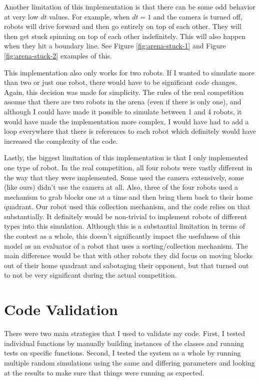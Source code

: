 \documentclass[12pt]{article}
\begin{document}
Another limitation of this implementation is that there can be some odd behavior at very low $dt$ values. For example, when $dt=1$ and the camera is turned off, robots will drive forward and then go entirely on top of each other. They will then get stuck spinning on top of each other indefinitely. This will also happen when they hit a boundary line. See Figure \ref{fig:arena-stuck-1} and Figure \ref{fig:arena-stuck-2} examples of this.

This implementation also only works for two robots. If I wanted to simulate more than two or just one robot, there would have to be significant code changes. Again, this decision was made for simplicity. The rules of the real competition assume that there are two robots in the arena (even if there is only one), and although I could have made it possible to simulate between 1 and 4 robots, it would have made the implementation more complex. I would have had to add a loop everywhere that there is references to each robot which definitely would have increased the complexity of the code.

Lastly, the biggest limitation of this implementation is that I only implemented one type of robot. In the real competition, all four robots were vastly different in the way that they were implemented. Some used the camera extensively, some (like ours) didn't use the camera at all. Also, three of the four robots used a mechanism to grab blocks one at a time and then bring them back to their home quadrant. Our robot used this collection mechanism, and the code relies on that substantially. It definitely would be non-trivial to implement robots of different types into this simulation. Although this is a substantial limitation in terms of the contest as a whole, this doesn't significantly impact the usefulness of this model as an evaluator of a robot that uses a sorting/collection mechanism. The main difference would be that with other robots they did focus on moving blocks out of their home quadrant and sabotaging their opponent, but that turned out to not be very significant during the actual competition.

\section{Code Validation}
There were two main strategies that I used to validate my code. First, I tested individual functions by manually building instances of the classes and running tests on specific functions. Second, I tested the system as a whole by running multiple random simulations using the same and differing parameters and looking at the results to make sure that things were running as expected.
\end{document}

